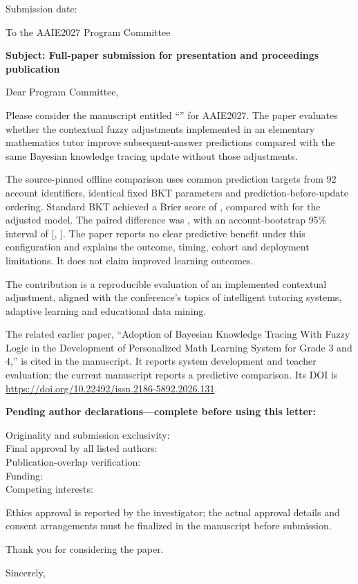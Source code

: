 \documentclass[11pt]{article}
\begin{document}
\thispagestyle{empty}
\AAIEDraftNotice
Submission date: \AAIEMissing

To the AAIE2027 Program Committee

\textbf{Subject: Full-paper submission for presentation and proceedings publication}

Dear Program Committee,

Please consider the manuscript entitled ``\AAIEPaperTitle'' for AAIE2027.
The paper evaluates whether the contextual fuzzy adjustments implemented in an
elementary mathematics tutor improve subsequent-answer predictions compared with
the same Bayesian knowledge tracing update without those adjustments.

The source-pinned offline comparison uses \ScoredTargets{} common prediction
targets from 92 account identifiers, identical fixed BKT parameters and
prediction-before-update ordering. Standard BKT achieved a Brier score of
\BktBrier{}, compared with \HybridBrier{} for the adjusted model. The paired
difference was \BrierDelta{}, with an account-bootstrap 95\% interval of
[\BrierCILower{}, \BrierCIUpper{}]. The paper reports no clear predictive benefit
under this configuration and explains the outcome, timing, cohort and deployment
limitations. It does not claim improved learning outcomes.

The contribution is a reproducible evaluation of an implemented contextual
adjustment, aligned with the conference's topics of intelligent tutoring systems,
adaptive learning and educational data mining.

The related earlier paper, ``Adoption of Bayesian Knowledge Tracing With Fuzzy
Logic in the Development of Personalized Math Learning System for Grade 3 and 4,''
is cited in the manuscript. It reports system development and teacher evaluation;
the current manuscript reports a predictive comparison. Its DOI is
\url{https://doi.org/10.22492/issn.2186-5892.2026.131}.

\textbf{Pending author declarations---complete before using this letter:}
\begin{description}
\item[Originality and submission exclusivity:] \AAIEOriginalityConfirmation
\item[Final approval by all listed authors:] \AAIEAuthorApproval
\item[Publication-overlap verification:] \AAIEOverlapConfirmation
\item[Funding:] \AAIEFunding
\item[Competing interests:] \AAIECompetingInterests
\end{description}
Ethics approval is reported by the investigator; the actual approval details and
consent arrangements must be finalized in the manuscript before submission.

Thank you for considering the paper.

Sincerely,

\AAIECorrespondingName\\
\AAIEAffiliations\\
\AAIECorrespondingEmail
\end{document}
